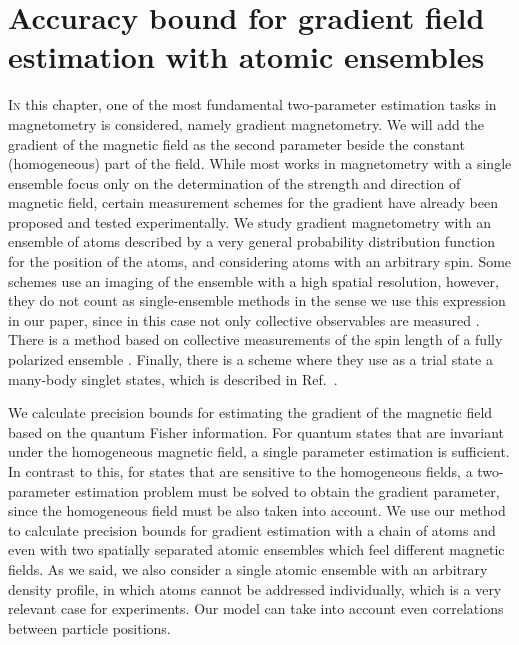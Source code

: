 \section[Metrology of the gradient magnetic field]
{Accuracy bound for gradient field estimation with atomic ensembles}
\label{sec:gm}



\lettrine[lines=2, findent=3pt, nindent=0pt]{I}{n} this chapter, one of the most fundamental two-parameter estimation tasks in magnetometry is considered, namely gradient magnetometry.
We will add the gradient of the magnetic field as the second parameter beside the constant (homogeneous) part of the field.
While most works in magnetometry with a single ensemble focus only on the determination of the strength and direction of magnetic field, certain measurement schemes for the gradient have already been proposed and tested experimentally.
We study gradient magnetometry with an ensemble of atoms described by a very general probability distribution function for the position of the atoms, and considering atoms with an arbitrary spin.
Some schemes use an imaging of the ensemble with a high spatial resolution, however, they do not count as single-ensemble methods in the sense we use this expression in our paper, since in this case not only collective observables are measured  \cite{Vengalattore2007,Zhou2010,Koschorreck2011}.
There is a method based on collective measurements of the spin length of a fully polarized ensemble \cite{Behbood2013}.
Finally, there is a scheme where they use as a trial state a many-body singlet states, which is described in Ref.~\cite{Urizar-Lanz2013}.

We calculate precision bounds for estimating the gradient of the magnetic field based on the quantum Fisher information.
For quantum states that are invariant under the homogeneous magnetic field, a single parameter estimation is sufficient.
In contrast to this, for states that are sensitive to the homogeneous fields, a two-parameter estimation problem must be solved to obtain the gradient parameter, since the homogeneous field must be also taken into account.
We use our method to calculate precision bounds for gradient estimation with a chain of atoms and even with two spatially separated atomic ensembles which feel different magnetic fields.
As we said, we also consider a single atomic ensemble with an arbitrary density profile, in which atoms cannot be addressed individually, which is a very relevant case for experiments.
Our model can take into account even correlations between particle positions.

